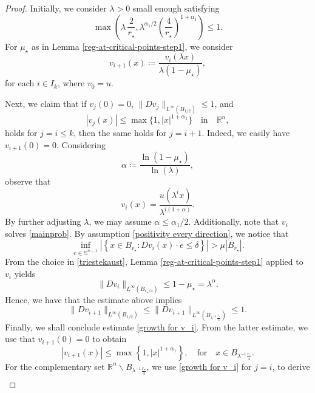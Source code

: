 \documentclass[10pt,a4paper]{amsart}
\begin{document}
\begin{proof}
Initially, we consider $\lambda>0$ small enough satisfying
\begin{equation}\label{smallness regime of lambda in reg at criti points}
    \max\left(\lambda\, \frac{2}{r_\star}, \lambda^{\alpha_1/2}\left(\frac{4}{r_\star}\right)^{1+\alpha_1}\right) \leq 1.
\end{equation}
For $\mu_\star$ as in Lemma \ref{reg-at-critical-points-step1}, we consider 
$$
    v_{i+1}(x) \coloneqq \frac{v_i(\lambda x)}{\lambda (1-\mu_\star)},
$$
for each $i \in I_k$, where $v_0 = u$.  

Next, we claim that if $v_j(0) = 0$, $\|Dv_j\|_{L^\infty(B_{1/2})} \leq 1$, and 
\begin{equation}\label{growth for v_i}
|v_j(x)|\leq \max\{1,|x|^{1+\alpha_1}\} \quad \mbox{in} \quad \mathbb{R}^n, 
\end{equation}
holds for $j=i \leq k$, then the same holds for $j=i+1$. Indeed, we easily have $v_{i+1}(0) = 0$. Considering 
\begin{equation}\label{triestekaust}
\alpha \coloneqq \frac{\ln(1-\mu_\star)}{\ln(\lambda)},
\end{equation}
observe that 
$$
    v_i(x) = \frac{u(\lambda^i x)}{\lambda^{i(1+\alpha)}}.
$$
By further adjusting $\lambda$, we may assume $\alpha \leq \alpha_1/2$. Additionally, note that $v_i$ solves \eqref{mainprob}. By assumption \eqref{positivity every direction}, we notice that
$$
    \inf_{e \in \mathbb{S}^{n-1}}\left|\left\{x \in B_{r_\star}\colon Dv_i(x) \cdot e \leq \delta  \right\} \right| > \mu |B_{r_\star}|.
$$
From the choice in \eqref{triestekaust}, Lemma \ref{reg-at-critical-points-step1} applied to $v_i$ yields
\begin{equation}\label{osc_improv_for_v_i}
\|Dv_i\|_{L^\infty\left(B_{r_\star/4} \right)} \leq 1-\mu_\star = \lambda^\alpha. 
\end{equation}
Hence, we have that the estimate above implies
$$
\|Dv_{i+1}\|_{L^\infty\left(B_{1/2}\right)} \leq \|Dv_{i+1}\|_{L^\infty\left(B_{\lambda^{-1}\frac{r_\star }{4}}\right)} \leq 1.
$$
Finally, we shall conclude estimate \eqref{growth for v_i}. From the latter estimate, we use that $v_{i+1}(0)=0$ to obtain 
$$
    |v_{i+1}(x)| \leq \max\left\{1,|x|^{1+\alpha_1} \right\}, \quad \mbox{for} \quad x \in B_{\lambda^{-1}\frac{r_\star }{4}}.
$$
For the complementary set $\mathbb{R}^n \backslash B_{\lambda^{-1}\frac{r_\star }{4}}$, we use \eqref{growth for v_i} for $j=i$, to derive
\begin{eqnarray*}

\end{eqnarray*}
\end{proof}
\end{document}
